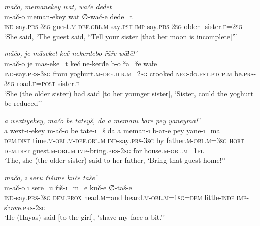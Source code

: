 \ea \label{ŽH.47}
\textit{māčo, mēmānekey wāt, wāče dēdēt} \\ 
\gll m-āč-o mēmān-ekey wāt ∅-wāč-e dēdē=t \\ 
 \textsc{ind-}say\textsc{.prs}\textsc{-3sg} guest\textsc{.m}\textsc{-def}\textsc{.obl}\textsc{.m} say\textsc{.pst} \textsc{imp-}say\textsc{.prs-}\textsc{2sg} older\_sister\textsc{\textsc{.f}}\textsc{=\textsc{2sg}} \\ 
\glt `She said, ‘The guest said, “Tell your sister [that her moon is incomplete]”'
\z 
 
\ea \label{ŽH.48}
\textit{māčo, je māseket keč nekerđebo řāře wāɫē!’} \\ 
\gll m-āč-o je mās-eke=t keč ne-kerđe b-o řā=ře wāɫē \\ 
 \textsc{ind-}say\textsc{.prs}\textsc{-3sg} from yoghurt\textsc{.m}\textsc{-def}\textsc{.dir}\textsc{.m}\textsc{=\textsc{2sg}} crooked \textsc{neg-}do\textsc{.pst}\textsc{.ptcp}\textsc{.m} be\textsc{.prs}\textsc{-3sg} road\textsc{\textsc{.f}}\textsc{=\textsc{post}} sister\textsc{\textsc{.f}} \\ 
\glt `She (the older sister) had said [to her younger sister], ‘Sister, could the yoghurt be reduced’'
\z 
 
\ea \label{ŽH.50}
\textit{ā wextīyekey, māčo be tāteyš, dā ā mēmānī bāre pey yāneymā!’} \\ 
\gll ā wext-ī-ekey m-āč-o be tāte-ī=š dā ā mēmān-ī b-ār-e pey yāne-ī=mā \\ 
 \textsc{dem.dist} time\textsc{.m}\textsc{-obl}\textsc{.m}\textsc{-def}\textsc{.obl}\textsc{.m} \textsc{ind-}say\textsc{.prs}\textsc{-3sg} by father\textsc{.m}\textsc{-obl}\textsc{.m}\textsc{=3sg} \textsc{hort} \textsc{dem.dist} guest\textsc{.m}\textsc{-obl}\textsc{.m} \textsc{imp-}bring\textsc{.prs}-\textsc{2sg} for house\textsc{.m}\textsc{-obl}\textsc{.m}\textsc{=1pl} \\ 
\glt `The, she (the older sister) said to her father, ‘Bring that guest home!’'
\z 
 
\ea \label{ŽH.53}
\textit{māčo, ī serū řīšīme kučē tāše’} \\ 
\gll m-āč-o ī sere=ū řīš-ī=m=e kuč-ē ∅-tāš-e \\ 
 \textsc{ind-}say\textsc{.prs}\textsc{-3sg} \textsc{dem.prox} head\textsc{.m}=and beard\textsc{.m}\textsc{-obl}\textsc{.m}\textsc{=1sg}\textsc{=dem} little\textsc{-indf} \textsc{imp-}shave\textsc{.prs}-\textsc{2sg} \\ 
\glt `He (Hayas) said [to the girl], ‘shave my face a bit.’'
\z 
 
